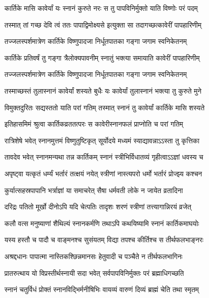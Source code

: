 \twolineshloka
{कार्तिके मासि कावेर्यां यः स्नानं कुरुते नरः}
{स तु पापविनिर्मुक्तो याति विष्णोः परं पदम्} %

\twolineshloka
{तस्मात् तां गच्छ देवि त्वं ततः पापाद्विमोक्ष्यसे}
{इत्युक्ता सा तदागच्छत्कावेरीं पापहारिणीम्} %

\twolineshloka
{तज्जलस्पर्शमात्रेण कार्तिके विष्णुपादजा}
{निर्धूतपातका गङ्गा जगाम स्वनिकेतनम्} %

\twolineshloka
{कार्तिके प्रतिवर्षं तु गङ्गा त्रैलोक्यपावनीम्}
{स्नातुं भक्त्या समायाति कावेरीं पापहारिणीम्} %

\twolineshloka
{तज्जलस्पर्शमात्रेण कार्तिके विष्णुपादजा}
{निर्धूतपातका गङ्गा जगाम स्वनिकेतनम्} %

\twolineshloka
{तस्माच्छस्तं तुलास्नानं कावेर्यां शस्यते बुधैः}
{यः कावेर्यां तुलास्नानं भक्त्या तु कुरुते मुने} %

\twolineshloka
{विमुक्तदुरितः सद्यस्ततो याति परां गतिम्}
{तस्मात् स्नानं तु कावेर्यां कार्तिके मासि शस्यते} %

\twolineshloka
{इतिहासमिमं श्रुत्वा कार्तिकव्रततत्परः}
{स कावेरीस्नानफलं प्राप्नोति च परां गतिम्} %

\twolineshloka
{रात्रिशेषे भवेत् स्नानमुत्तमं विष्णुतुष्टिकृत्}
{सूर्योदये मध्यमं स्याद्यावन्नाऽऽस्ता तु कृत्तिका} %

\twolineshloka
{तावदेव भवेत् स्नानमन्यथा तन्न कार्तिकम्}
{स्नानं स्त्रीभिर्विधातव्यं गृहीत्वाऽऽज्ञां धवस्य च} %

\twolineshloka
{अपृष्ट्वा यत्कृतं धर्म्यं भर्तारं तत्क्षयं नयेत्}
{स्त्रीणां नास्त्यपरो धर्मो भर्तारं प्रोज्झ्य कश्चन} %

\twolineshloka
{कुर्यात्सहस्रपापानि भर्त्राज्ञां या समाचरेत्}
{सैषा धर्मवती लोके न जायेत व्रतादिना} %

\twolineshloka
{दरिद्रः पतितो मूर्खो दीनोऽपि यदि चेत्पतिः}
{तादृशः शरणं स्त्रीणां तत्त्यागान्निरयं व्रजेत्} %

\twolineshloka
{कलौ वत्स मनुष्याणां शैथिल्यं स्नानकर्मणि}
{तथाऽपि कथयिष्यामि स्नानं कार्तिकमाघयोः} %

\twolineshloka
{यस्य हस्तौ च पादौ च वाङ्मनश्च सुसंयतम्}
{विद्या तपश्च कीर्तिश्च स तीर्थफलभाङ्नरः} %

\twolineshloka
{अश्रद्दधानः पापात्मा नास्तिकश्छिन्नमानसः}
{हेतुवादी च पञ्चैते न तीर्थफलभागिनः} %

\twolineshloka
{प्रातरुत्थाय यो विप्रस्तीर्थस्नायी सदा भवेत्}
{सर्वपापविनिर्मुक्तः परं ब्रह्माधिगच्छति} %

\twolineshloka
{स्नानं चतुर्विधं प्रोक्तं स्नानविद्भिर्मनीषिभिः}
{वायव्यं वारुणं दिव्यं ब्राह्मं चेति तथा स्मृतम्} %

